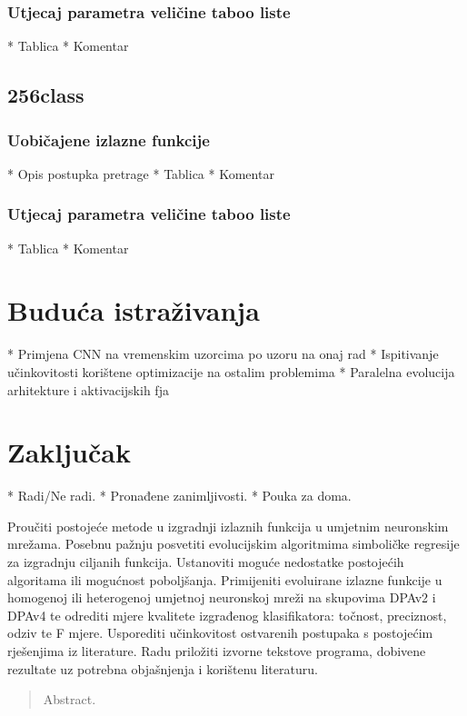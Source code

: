 \documentclass[times, utf8, diplomski]{fer}
\begin{document}
\subsection{Utjecaj parametra veličine taboo liste}
* Tablica
* Komentar

\section{256class}

\subsection{Uobičajene izlazne funkcije}
* Opis postupka pretrage
* Tablica
* Komentar

\subsection{Utjecaj parametra veličine taboo liste}
* Tablica
* Komentar

\chapter{Buduća istraživanja}
* Primjena CNN na vremenskim uzorcima po uzoru na onaj rad
* Ispitivanje učinkovitosti korištene optimizacije na ostalim problemima
* Paralelna evolucija arhitekture i aktivacijskih fja

\chapter{Zaključak}
* Radi/Ne radi. 
* Pronađene zanimljivosti. 
* Pouka za doma.




\begin{sazetak}
Proučiti postojeće metode u izgradnji izlaznih funkcija u umjetnim neuronskim mrežama. Posebnu pažnju posvetiti evolucijskim algoritmima simboličke regresije za izgradnju ciljanih funkcija. Ustanoviti moguće nedostatke postojećih algoritama ili mogućnost poboljšanja. Primijeniti evoluirane izlazne funkcije u homogenoj ili heterogenoj umjetnoj neuronskoj mreži na skupovima DPAv2 i DPAv4 te odrediti mjere kvalitete izgrađenog klasifikatora: točnost, preciznost, odziv te F mjere. Usporediti učinkovitost ostvarenih postupaka s postojećim rješenjima iz literature. Radu priložiti izvorne tekstove programa, dobivene rezultate uz potrebna objašnjenja i korištenu literaturu.

\end{sazetak}

\begin{abstract}
Abstract.

\end{abstract}
\end{document}

